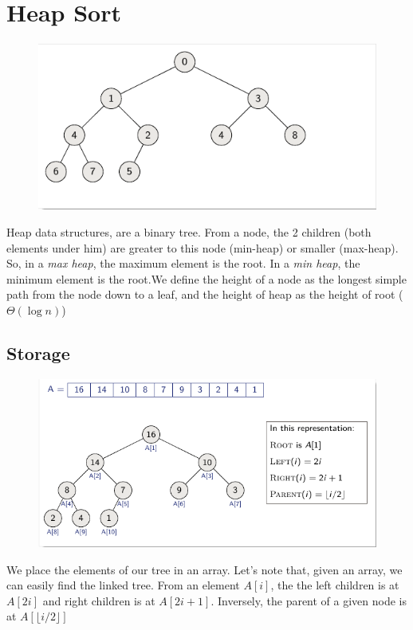 \documentclass[12pt,twoside,a4paper]{article}
\begin{document}
\section{Heap Sort}
\begin{figure}
	\includegraphics[scale=0.6]{images/minHeap}
\end{figure}
Heap data structures, are a binary tree. From a node, the 2 children (both elements under him) are greater to this node (min-heap) or smaller (max-heap). So, in a \textit{max heap}, the maximum element is the root. In a \textit{min heap}, the minimum element is the root.We define the height of a node as the longest simple path from the node down to a leaf, and the height of heap as the height of root ($\Theta(\log n)$)

\subsection{Storage}
\begin{figure}[h!]
	\centering
	\includegraphics[scale=1]{images/buildHeap}
\end{figure}
We place the elements of our tree in an array. Let's note that, given an array, we can easily find the linked tree. From an element $A[i]$, the the left children is at $A[2i]$ and right children is at $A[2i+1]$. Inversely, the parent of a given node is at $A[\lfloor i/2 \rfloor]$
\end{document}
